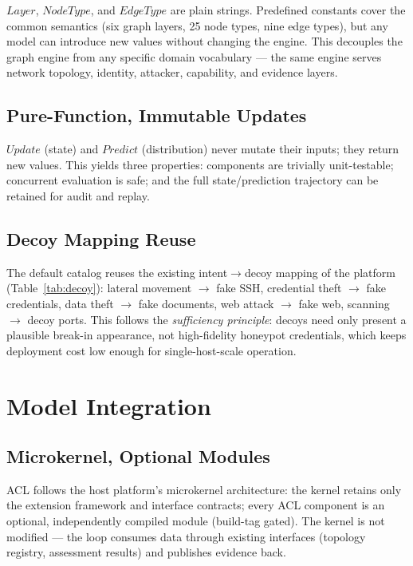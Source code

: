 \documentclass[preprints,article,accept,oneauthor]{Definitions/mdpi}
\begin{document}
$\mathit{Layer}$, $\mathit{NodeType}$, and $\mathit{EdgeType}$ are plain
strings. Predefined constants cover the common semantics (six graph layers,
25 node types, nine edge types), but any model can introduce new values
without changing the engine. This decouples the graph engine from any
specific domain vocabulary --- the same engine serves network topology,
identity, attacker, capability, and evidence layers.

\subsection{Pure-Function, Immutable Updates}

$\mathit{Update}$ (state) and $\mathit{Predict}$ (distribution) never mutate
their inputs; they return new values. This yields three properties:
components are trivially unit-testable; concurrent evaluation is safe; and
the full state/prediction trajectory can be retained for audit and replay.

\subsection{Decoy Mapping Reuse}

The default catalog reuses the existing intent$\to$decoy mapping of the
platform (Table~\ref{tab:decoy}): lateral movement $\to$ fake SSH,
credential theft $\to$ fake credentials, data theft $\to$ fake documents,
web attack $\to$ fake web, scanning $\to$ decoy ports. This follows the
\textit{sufficiency principle}: decoys need only present a plausible
break-in appearance, not high-fidelity honeypot credentials, which keeps
deployment cost low enough for single-host-scale operation.

\section{Model Integration}
\label{sec:integration}

\subsection{Microkernel, Optional Modules}
\label{sec:microkernel}

ACL follows the host platform's microkernel architecture: the kernel retains
only the extension framework and interface contracts; every ACL component is
an optional, independently compiled module (build-tag gated). The kernel is
not modified --- the loop consumes data through existing interfaces
(topology registry, assessment results) and publishes evidence back.
\end{document}
